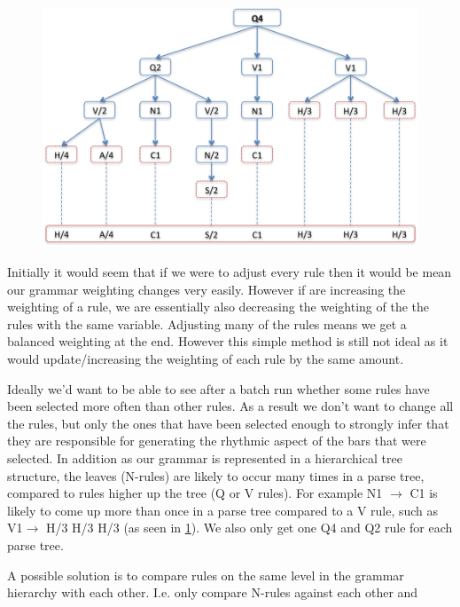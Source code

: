 \documentclass[pdftex,12pt,a4paper]{report}
\begin{document}
\begin{figure}[here]
  \centering
  \includegraphics[scale=0.85]{figure/q4exampleparsetree.png}
  \label{fig:q4exampleparsetree}
\end{figure}

Initially it would seem that if we were to adjust every rule then it would be mean our grammar weighting changes very easily. However if are increasing the weighting of a rule, we are essentially also decreasing the weighting of the the rules with the same variable. Adjusting many of the rules means we get a balanced weighting at the end. However this simple method is still not ideal as it would update/increasing the weighting of each rule by the same amount.

Ideally we'd want to be able to see after a batch run whether some rules have been selected more often than other rules. As a result we don't want to change all the rules, but only the ones that have been selected enough to strongly infer that they are responsible for generating the rhythmic aspect of the bars that were selected. In addition as our grammar is represented in a hierarchical tree structure, the leaves (N-rules) are likely to occur many times in a parse tree, compared to rules higher up the tree (Q or V rules). For example N1 $\rightarrow$ C1 is likely to come up more than once in a parse tree compared to a V rule, such as V1$\rightarrow$ H/3 H/3 H/3 (as seen in \ref{fig:q4exampleparsetree}). We also only get one Q4 and Q2 rule for each parse tree. 

A possible solution is to compare rules on the same level in the grammar hierarchy with each other. I.e. only compare N-rules against each other and 
\end{document}

